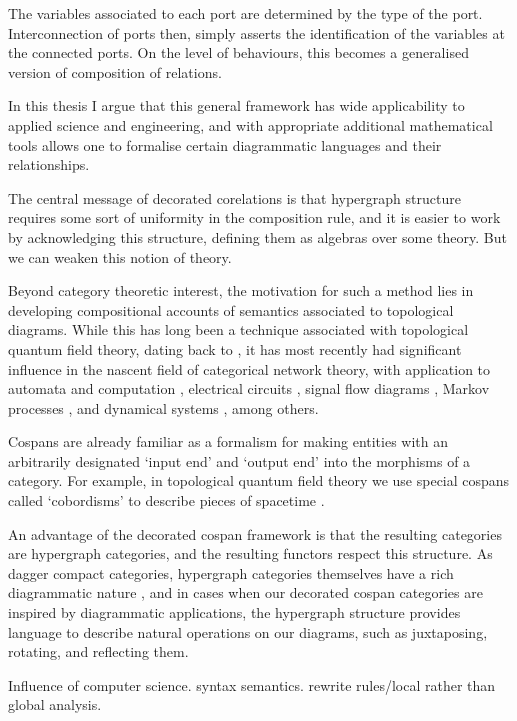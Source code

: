 
The variables associated to each port are determined by the type of the port.
Interconnection of ports then, simply asserts the identification of the
variables at the connected ports. On the level of behaviours, this becomes a
generalised version of composition of relations.

In this thesis I argue that this general framework has wide applicability to
applied science and engineering, and with appropriate additional mathematical
tools allows one to formalise certain diagrammatic languages and their
relationships.

The central message of decorated corelations is that hypergraph structure
requires some sort of uniformity in the composition rule, and it is easier to
work by acknowledging this structure, defining them as algebras over some
theory. But we can weaken this notion of theory.

Beyond category theoretic interest, the motivation for such a method lies in
developing compositional accounts of semantics associated to topological
diagrams. While this has long been a technique associated with topological
quantum field theory, dating back to \cite{At}, it has most recently had
significant influence in the nascent field of categorical network theory, with
application to automata and computation \cite{KSW2, Sp}, electrical circuits
\cite{BF}, signal flow diagrams \cite{BSZ, BE}, Markov processes \cite{BP,
ASW}, and dynamical systems \cite{VSL}, among others. 

Cospans are already familiar as a formalism for making entities with an
arbitrarily designated `input end' and `output end' into the morphisms of a
category.  For example, in topological quantum field theory we use special
cospans called `cobordisms' to describe pieces of spacetime \cite{BL,BaezStay}.

An advantage of the decorated cospan framework is that the resulting categories
are hypergraph categories, and the resulting functors respect this structure.
As dagger compact categories, hypergraph categories themselves have a rich
diagrammatic nature \cite{Se}, and in cases when our decorated cospan categories
are inspired by diagrammatic applications, the hypergraph structure provides
language to describe natural operations on our diagrams, such as juxtaposing,
rotating, and reflecting them.

Influence of computer science. syntax semantics. rewrite rules/local rather than
global analysis.

